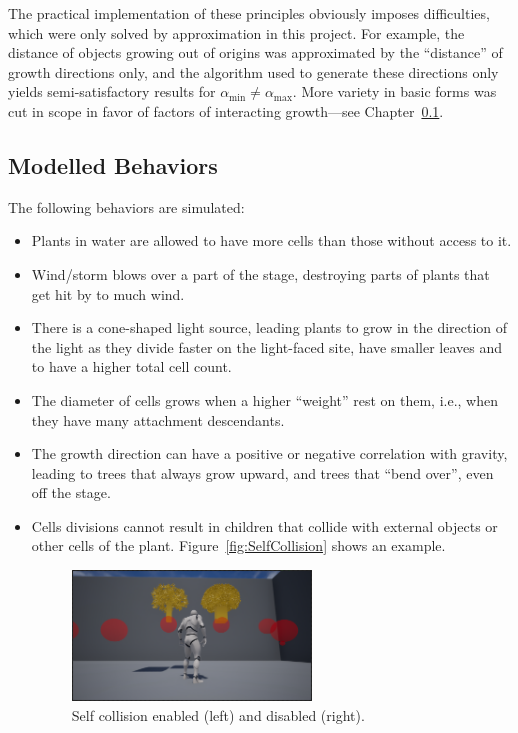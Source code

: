 \documentclass[11pt, abstract=on]{scrartcl}
\begin{document}
The practical implementation of these principles obviously imposes difficulties, which were only solved by approximation in this project. For example, the distance of objects growing out of origins was approximated by the ``distance'' of growth directions only, and the algorithm used to generate these directions only yields semi-satisfactory results for $\alpha_\text{min} \neq \alpha_\text{max}$. More variety in basic forms was cut in scope in favor of factors of interacting growth---see Chapter~\ref{cptr:Influencing}.

\subsection{Modelled Behaviors} \label{cptr:Influencing}
The following behaviors are simulated:
\begin{itemize}
	\item Plants in water are allowed to have more cells than those without access to it.
	\item Wind/storm blows over a part of the stage, destroying parts of plants that get hit by to much wind.
	\item There is a cone-shaped light source, leading plants to grow in the direction of the light as they divide faster on the light-faced site, have smaller leaves and to have a higher total cell count.
	\item The diameter of cells grows when a higher ``weight'' rest on them, i.e., when they have many attachment descendants.
	\item The growth direction can have a positive or negative correlation with gravity, leading to trees that always grow upward, and trees that ``bend over'', even off the stage.
	\item Cells divisions cannot result in children that collide with external objects or other cells of the plant. Figure~\ref{fig:SelfCollision} shows an example.
		\begin{figure} 
 		 \centering
 		    \includegraphics[width=0.6\textwidth]{SS_SelfCollision.png}
 		 \caption{Self collision enabled (left) and disabled (right).}

\end{figure}
\end{itemize}
\end{document}
